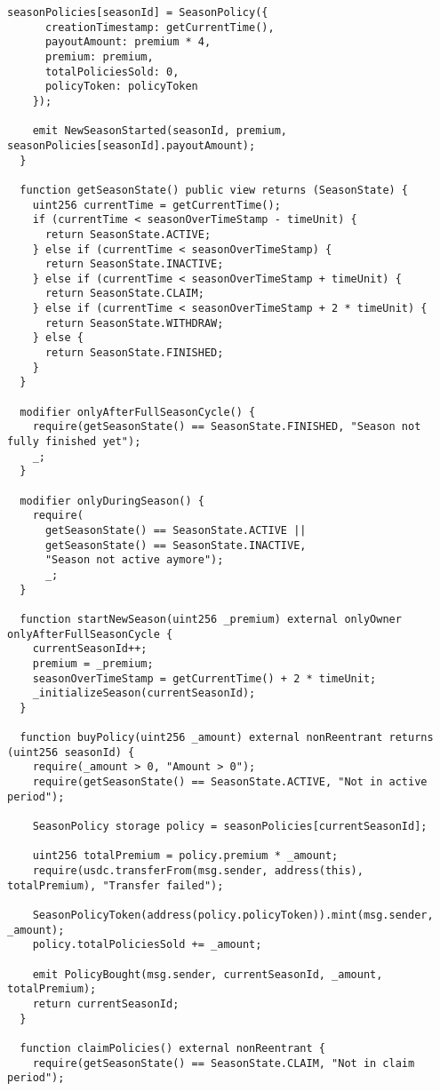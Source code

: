 \begin{lstlisting}[style=soliditystyle, caption={RainyDayFund.sol - Main Insurance Contract},label={lst:lstlisting}]
    seasonPolicies[seasonId] = SeasonPolicy({
      creationTimestamp: getCurrentTime(),
      payoutAmount: premium * 4,
      premium: premium,
      totalPoliciesSold: 0,
      policyToken: policyToken
    });

    emit NewSeasonStarted(seasonId, premium, seasonPolicies[seasonId].payoutAmount);
  }

  function getSeasonState() public view returns (SeasonState) {
    uint256 currentTime = getCurrentTime();
    if (currentTime < seasonOverTimeStamp - timeUnit) {
      return SeasonState.ACTIVE;
    } else if (currentTime < seasonOverTimeStamp) {
      return SeasonState.INACTIVE;
    } else if (currentTime < seasonOverTimeStamp + timeUnit) {
      return SeasonState.CLAIM;
    } else if (currentTime < seasonOverTimeStamp + 2 * timeUnit) {
      return SeasonState.WITHDRAW;
    } else {
      return SeasonState.FINISHED;
    }
  }

  modifier onlyAfterFullSeasonCycle() {
    require(getSeasonState() == SeasonState.FINISHED, "Season not fully finished yet");
    _;
  }

  modifier onlyDuringSeason() {
    require(
      getSeasonState() == SeasonState.ACTIVE ||
      getSeasonState() == SeasonState.INACTIVE,
      "Season not active aymore");
      _;
  }

  function startNewSeason(uint256 _premium) external onlyOwner onlyAfterFullSeasonCycle {
    currentSeasonId++;
    premium = _premium;
    seasonOverTimeStamp = getCurrentTime() + 2 * timeUnit;
    _initializeSeason(currentSeasonId);
  }

  function buyPolicy(uint256 _amount) external nonReentrant returns (uint256 seasonId) {
    require(_amount > 0, "Amount > 0");
    require(getSeasonState() == SeasonState.ACTIVE, "Not in active period");

    SeasonPolicy storage policy = seasonPolicies[currentSeasonId];

    uint256 totalPremium = policy.premium * _amount;
    require(usdc.transferFrom(msg.sender, address(this), totalPremium), "Transfer failed");

    SeasonPolicyToken(address(policy.policyToken)).mint(msg.sender, _amount);
    policy.totalPoliciesSold += _amount;

    emit PolicyBought(msg.sender, currentSeasonId, _amount, totalPremium);
    return currentSeasonId;
  }

  function claimPolicies() external nonReentrant {
    require(getSeasonState() == SeasonState.CLAIM, "Not in claim period");


\end{lstlisting}
